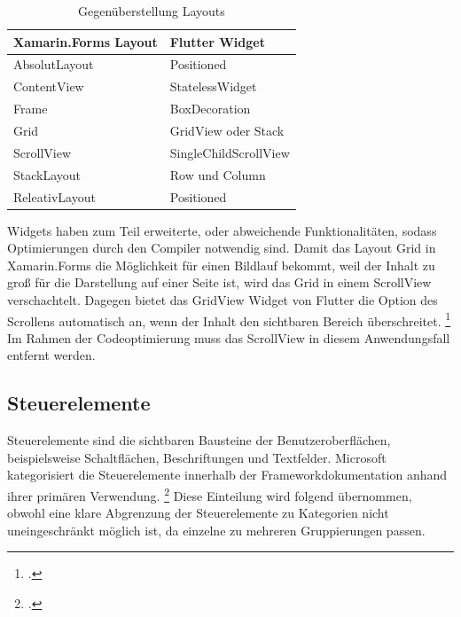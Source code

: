 \begin{table}[!ht]
\begin{tabularx}{\textwidth}{X|X}
   \textbf{Xamarin.Forms Layout} & \textbf{Flutter Widget}  \\
\hline
	AbsolutLayout       		&  Positioned	 			\\ 
	ContentView       		&  StatelessWidget	 			\\ 
	Frame       					&  BoxDecoration     	 			\\ 
	Grid            				&  GridView oder Stack		\\ 
	ScrollView            		&  SingleChildScrollView		\\ 
	StackLayout       		&  Row und Column  	 			\\ 
	ReleativLayout           &  Positioned		\\ 

\end{tabularx}
\caption{Gegenüberstellung Layouts}
 \label{tab:XamLayouts}
\end{table}

Widgets haben zum Teil erweiterte,  oder abweichende Funktionalitäten, sodass Optimierungen durch den Compiler notwendig sind.  Damit das Layout \glq Grid\grq{} in Xamarin.Forms die Möglichkeit für einen Bildlauf bekommt, weil der Inhalt zu groß für die Darstellung auf einer Seite ist, wird das \glq Grid\grq{} in einem \glq ScrollView\grq{} verschachtelt. Dagegen bietet das \glq GridView\grq{} Widget von Flutter die Option des Scrollens automatisch an, wenn der Inhalt den sichtbaren Bereich überschreitet. \footcite[Vgl.][Abgerufen am \today]{GoogleFlutterGridView2020} Im Rahmen der Codeoptimierung muss das \glq ScrollView\grq{} in diesem Anwendungsfall entfernt werden.

\subsection{Steuerelemente}

Steuerelemente sind die sichtbaren Bausteine der Benutzeroberflächen,  beispielsweise Schaltflächen, Beschriftungen und Textfelder.  
Microsoft kategorisiert die Steuerelemente innerhalb der Frameworkdokumentation anhand ihrer primären Verwendung. \footcite[Vgl.][Abgerufen am \today]{MicrosoftXamViews2020} Diese Einteilung wird folgend übernommen,  obwohl eine klare Abgrenzung der  Steuerelemente zu Kategorien nicht uneingeschränkt möglich ist,  da einzelne zu mehreren Gruppierungen passen.


